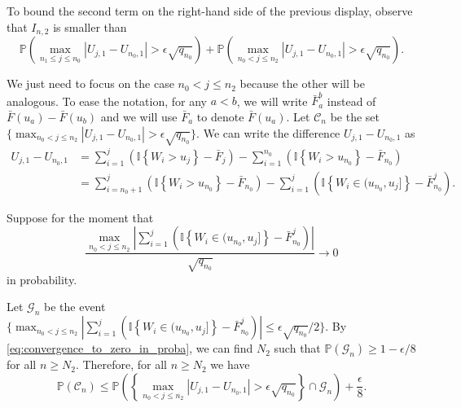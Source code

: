\documentclass[sn-mathphys-ay]{sn-jnl}%
\renewcommand{\P}{\mathbb{P}}
\begin{document}
\begin{appendices}
To bound the second term on the right-hand side of the previous display, observe that
$I_{n,2}$ is smaller than
\begin{equation*}
    \P\left(\max_{n_1\leq j \leq n_0} \left| U_{j,1}-U_{n_0,1} \right|>\epsilon\sqrt{q_{n_0}}\right) + \P\left(\max_{n_0< j \leq n_2} \left| U_{j,1}-U_{n_0,1} \right|>\epsilon\sqrt{q_{n_0}}\right).
\end{equation*}

We just need to focus on the case $n_0<j\leq n_2$ because the other will be
analogous. To ease the notation, for any $a<b$, we will write $\bar{F}_{a}^{b}$
instead of $\bar{F}\left(u_{a}\right)-\bar{F}\left(u_{b}\right)$ and we will use
$\bar{F}_a$ to denote $\bar{F}(u_{a})$. Let $\mathcal{C}_n$ be the set $\{\max_{n_0<
        j \leq n_2} | U_{j,1}-U_{n_0,1} |>\epsilon\sqrt{q_{n_0}}\}$. We can write the
difference $U_{j,1}-U_{n_0,1}$ as
\begin{align}
    U_{j,1}-U_{n_0,1} & =\sum\limits_{i = 1}^j \left(\mathbb{I}\left\{ {{W_i} > u_j} \right\}-\bar{F}_j\right) - \sum\limits_{i = 1}^{n_0} \left(\mathbb{I}\left\{ {{W_i} > u_{n_0}} \right\}-\bar{F}_{n_0}\right)\nonumber                                                   \\
                      & = \sum\limits_{i = n_0+1}^j \left(\mathbb{I}\left\{ {{W_i} > u_{n_0}} \right\}-\bar{F}_{n_0}\right) - \sum\limits_{i = 1}^{j} \left(\mathbb{I}\left\{ {{W_i} \in (u_{n_0},u_j]} \right\}-\bar{F}_{n_0}^{j}\right)\label{eq:difference_decomposition}.
\end{align}

Suppose for the moment that
\begin{equation}\label{eq:convergence_to_zero_in_proba}
    \frac{\underset{n_0<j \leq n_2}{\max}\left|\sum\limits_{i = 1}^{j} \left(\mathbb{I}\left\{ {{W_i} \in (u_{n_0},u_j]} \right\}-\bar{F}_{n_0}^{j}\right)\right|}{\sqrt{q_{n_0}}}\to 0
\end{equation}
in probability.

Let $\mathcal{G}_n$ be the event $\{\max_{n_0< j \leq n_2}{|\sum_{i = 1}^{j}
    (\mathbb{I}\left\{ {{W_i} \in (u_{n_0},u_j]}
            \right\}-\bar{F}_{n_0}^{j})|}\leq{\epsilon\sqrt{q_{n_0}}}/{2}\}$. By
\eqref{eq:convergence_to_zero_in_proba}, we can find $N_2$ such that $\P\left(
    \mathcal{G}_n \right)\geq1-{\epsilon}/{8}$ for all $n\geq N_2$. Therefore, for all
$n\geq N_2$ we have
\begin{equation*}
    \P\left(\mathcal{C}_n\right) \leq \P\left( \left\{ \max_{n_0< j \leq n_2} \left| U_{j,1}-U_{n_0,1} \right|>\epsilon\sqrt{q_{n_0}} \right\}\cap\mathcal{G}_n \right)+ \frac{\epsilon}{8}.
\end{equation*}


\end{appendices}
\end{document}
